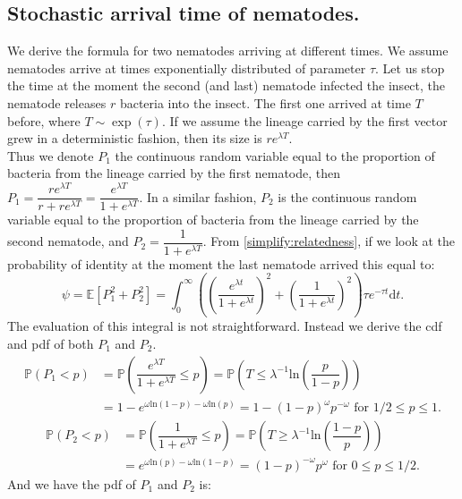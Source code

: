 \documentclass{article}
\newcommand{\ud}{{\mathrm{d}}}
\newcommand{\pr}{{\mathbb{P}}}
\begin{document}
 \subsection{Stochastic arrival time of nematodes.}
  We derive the formula for two nematodes arriving at different times. We assume nematodes arrive at times exponentially distributed of parameter $ \tau$. Let us stop the time at the moment the second (and last) nematode infected the insect, the nematode releases $r$ bacteria into the insect. The first one arrived at time $T$ before, where $T\sim \exp ( \tau)$. If we assume the lineage carried by the first vector grew in a deterministic fashion, then its size is $r e^{\lambda  T}$. \\
  Thus we denote $P_1$ the continuous random variable equal to the proportion of bacteria from the lineage carried by the first nematode, then $P_1=\dfrac{r e^{\lambda T}}{r+re^{\lambda T}}=\dfrac{ e^{\lambda T}}{1+e^{\lambda T}}$. In a similar fashion, $P_2$ is the continuous random variable equal to the proportion of bacteria from the lineage carried by the second nematode, and $P_2=\dfrac{1}{1+e^{\lambda T}}$.
  From \eqref{simplify:relatedness}, if we look at the probability of identity at the moment the last nematode arrived this equal to:
  \begin{equation}
  \psi=\mathbb{E}[P_1^2+P_2^2]=\int_0^\infty \left( \left( \dfrac{ e^{\lambda t}}{1+e^{\lambda t}} \right)^2 + \left( \dfrac{1}{1+e^{\lambda t}} \right)^2 \right) \tau e^{ -\tau t } \ud t.
  \end{equation}
  The evaluation of this integral is not straightforward. Instead we derive the cdf and pdf of both $P_1$ and $P_2$.
  \begin{align}
  \pr ( P_1 < p) &= \pr \left(\dfrac{e^{\lambda T}}{1+e^{\lambda T}} \leq p\right)= \pr \left(T \leq \lambda^{-1} \mathrm{ln}\left( \dfrac{p}{1-p} \right) \right) \\
  &=  1- e^{\omega\mathrm{ln}(1-p)-\omega \mathrm{ln}(p)  } = 1-(1-p)^{\omega} p^{-\omega} \text{ for } 1/2 \leq p \leq 1.
  \end{align}  
  \begin{align}
  \pr ( P_2 < p) &= \pr \left(\dfrac{1}{1+e^{\lambda T}} \leq p\right)= \pr \left(T \geq \lambda^{-1} \mathrm{ln}\left( \dfrac{1-p}{p} \right) \right) \\
  &=  e^{\omega \mathrm{ln}(p)-\omega\mathrm{ln}(1-p)  } = (1-p)^{-\omega} p^\omega \text{ for } 0 \leq p \leq 1/2.
  \end{align}
  And we have the pdf of $P_1$ and $P_2$ is:
\end{document}
